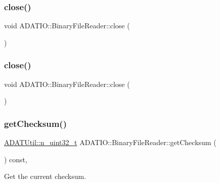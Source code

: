 \subsubsection{\texorpdfstring{close()}{close()}\hspace{0.1cm}{\footnotesize\ttfamily [2/3]}}
{\footnotesize\ttfamily void A\+D\+A\+T\+I\+O\+::\+Binary\+File\+Reader\+::close (\begin{DoxyParamCaption}{ }\end{DoxyParamCaption})}

\mbox{\label{classADATIO_1_1BinaryFileReader_af0501cb948e5220209226970867dbb26}} 
\subsubsection{\texorpdfstring{close()}{close()}\hspace{0.1cm}{\footnotesize\ttfamily [3/3]}}
{\footnotesize\ttfamily void A\+D\+A\+T\+I\+O\+::\+Binary\+File\+Reader\+::close (\begin{DoxyParamCaption}{ }\end{DoxyParamCaption})}

\mbox{\label{classADATIO_1_1BinaryFileReader_addb0cfdf4c3df174327b1abc136cfc68}} 
\subsubsection{\texorpdfstring{getChecksum()}{getChecksum()}\hspace{0.1cm}{\footnotesize\ttfamily [1/3]}}
{\footnotesize\ttfamily \mbox{\hyperlink{namespaceADATUtil_ad945a8afa4db2d1f89b731964adae97e}{A\+D\+A\+T\+Util\+::n\+\_\+uint32\+\_\+t}} A\+D\+A\+T\+I\+O\+::\+Binary\+File\+Reader\+::get\+Checksum (\begin{DoxyParamCaption}{ }\end{DoxyParamCaption}) const\hspace{0.3cm}{\ttfamily [inline]}, {\ttfamily [virtual]}}



Get the current checksum. 



